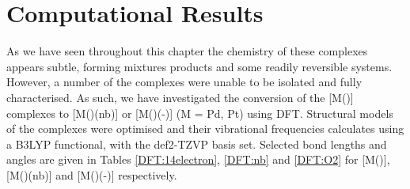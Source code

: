 



\section{Computational Results}

As we have seen throughout this chapter the chemistry of these complexes appears subtle, forming mixtures products and some readily reversible systems.  However, a number of the complexes were unable to be isolated and fully characterised.  As such, we have investigated the conversion of the [M(\tBuxantphos)] complexes to [M(\tBuxantphos)(nb)] or [M(\tBuxantphos)(\hapto{}-)] (M = Pd, Pt) using DFT.  Structural models of the complexes were optimised and their vibrational frequencies calculates using a B3LYP functional,\cite{Becke1993, Lee1988, Vosko1980, Stephens1994} with the def2-TZVP basis set.\cite{Andrae1990, Weigend2005}  Selected bond lengths and angles are given in Tables \ref{DFT:14electron}, \ref{DFT:nb} and \ref{DFT:O2} for [M(\tBuxantphos)], [M(\tBuxantphos)(nb)] and [M(\tBuxantphos)(\hapto{}-)] respectively.  



